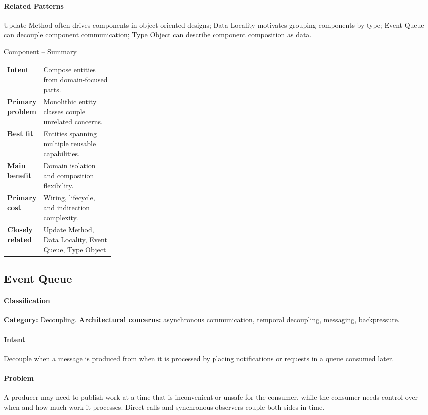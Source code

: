 \documentclass[11pt]{article}
\begin{document}
\paragraph{Related Patterns} Update Method often drives components in object-oriented designs; Data Locality motivates grouping components by type; Event Queue can decouple component communication; Type Object can describe component composition as data.

\begin{patternsummary}{Component -- Summary}
\begin{tabularx}{\linewidth}{@{}>{\bfseries}p{0.25\linewidth}X@{}}
Intent & Compose entities from domain-focused parts. \\
Primary problem & Monolithic entity classes couple unrelated concerns. \\
Best fit & Entities spanning multiple reusable capabilities. \\
Main benefit & Domain isolation and composition flexibility. \\
Primary cost & Wiring, lifecycle, and indirection complexity. \\
Closely related & Update Method, Data Locality, Event Queue, Type Object \\
\end{tabularx}
\end{patternsummary}

\subsection{Event Queue}\label{pat:event-queue}
\paragraph{Classification} \textbf{Category:} Decoupling. \textbf{Architectural concerns:} asynchronous communication, temporal decoupling, messaging, backpressure.
\paragraph{Intent} Decouple when a message is produced from when it is processed by placing notifications or requests in a queue consumed later.
\paragraph{Problem} A producer may need to publish work at a time that is inconvenient or unsafe for the consumer, while the consumer needs control over when and how much work it processes. Direct calls and synchronous observers couple both sides in time.
\end{document}
